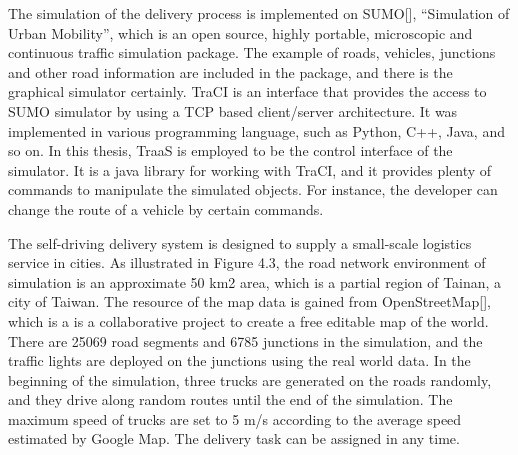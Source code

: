 \documentclass[12pt]{ksthesis}
\begin{document}
\begin{thesis}
{The simulation of the delivery process is implemented on SUMO[], “Simulation of Urban Mobility”, which is an open source, highly portable, microscopic and continuous traffic simulation package. The example of roads, vehicles, junctions and other road information are included in the package, and there is the graphical simulator certainly. TraCI is an interface that provides the access to SUMO simulator by using a TCP based client/server architecture. It was implemented in various programming language, such as Python, C++, Java, and so on. In this thesis, TraaS is employed to be the control interface of the simulator. It is a java library for working with TraCI, and it provides plenty of commands to manipulate the simulated objects. For instance, the developer can change the route of a vehicle by certain commands.

The self-driving delivery system is designed to supply a small-scale logistics service in cities. As illustrated in Figure 4.3, the road network environment of simulation is an approximate 50 km2 area, which is a partial region of Tainan, a city of Taiwan. The resource of the map data is gained from OpenStreetMap[], which is a is a collaborative project to create a free editable map of the world. There are 25069 road segments and 6785 junctions in the simulation, and the traffic lights are deployed on the junctions using the real world data. In the beginning of the simulation, three trucks are generated on the roads randomly, and they drive along random routes until the end of the simulation. The maximum speed of trucks are set to 5 m/s according to the average speed estimated by Google Map. The delivery task can be assigned in any time.

}
\end{thesis}
\end{document}
